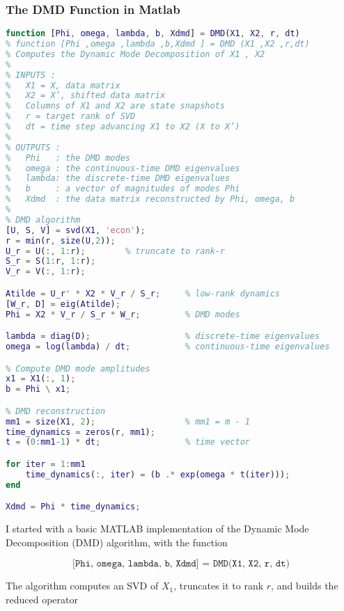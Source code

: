 \documentclass{article}
\begin{document}
\vspace{1cm}

\subsubsection*{The DMD Function in Matlab}



\begin{lstlisting}[language=Matlab, caption={}]
function [Phi, omega, lambda, b, Xdmd] = DMD(X1, X2, r, dt)
% function [Phi ,omega ,lambda ,b,Xdmd ] = DMD (X1 ,X2 ,r,dt)
% Computes the Dynamic Mode Decomposition of X1 , X2
%
% INPUTS :
%   X1 = X, data matrix
%   X2 = X’, shifted data matrix
%   Columns of X1 and X2 are state snapshots
%   r = target rank of SVD
%   dt = time step advancing X1 to X2 (X to X’)
%
% OUTPUTS :
%   Phi   : the DMD modes
%   omega : the continuous-time DMD eigenvalues
%   lambda: the discrete-time DMD eigenvalues
%   b     : a vector of magnitudes of modes Phi
%   Xdmd  : the data matrix reconstructed by Phi, omega, b
%
% DMD algorithm
[U, S, V] = svd(X1, 'econ');
r = min(r, size(U,2));
U_r = U(:, 1:r);        % truncate to rank-r
S_r = S(1:r, 1:r);
V_r = V(:, 1:r);

Atilde = U_r' * X2 * V_r / S_r;     % low-rank dynamics
[W_r, D] = eig(Atilde);
Phi = X2 * V_r / S_r * W_r;         % DMD modes

lambda = diag(D);                   % discrete-time eigenvalues
omega = log(lambda) / dt;           % continuous-time eigenvalues

% Compute DMD mode amplitudes
x1 = X1(:, 1);
b = Phi \ x1;

% DMD reconstruction
mm1 = size(X1, 2);                  % mm1 = m - 1
time_dynamics = zeros(r, mm1);
t = (0:mm1-1) * dt;                 % time vector

for iter = 1:mm1
    time_dynamics(:, iter) = (b .* exp(omega * t(iter)));
end

Xdmd = Phi * time_dynamics;
\end{lstlisting}

\vspace{1cm}

I started with a basic MATLAB implementation of the Dynamic Mode Decomposition (DMD) algorithm, with the function 

\[
\texttt{[Phi, omega, lambda, b, Xdmd] = DMD(X1, X2, r, dt)}
\]  
  

The algorithm computes an SVD of \(X_1\), truncates it to rank \(r\), and builds the reduced operator  
\end{document}
